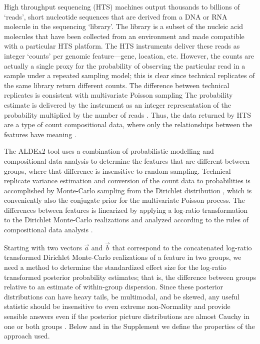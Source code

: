 High throughput sequencing (HTS) machines output thousands to billions of `reads', short nucleotide sequences that are derived from a DNA or RNA molecule in the sequencing `library'. The library is a subset of the nucleic acid molecules that have been collected from an environment and made compatible with a particular HTS platform. The HTS instruments deliver these reads as integer `counts' per genomic feature---gene, location, etc. However, the counts are actually a single proxy for the probability of observing the particular read in a sample under a repeated sampling model; this is clear since technical replicates of the same library return different counts. The difference between technical replicates is consistent with multivariate Poisson sampling \citep{fernandes:2013, gloorAJS:2016} The probability estimate is delivered by the instrument as an integer representation of the probability multiplied by the number of reads  \citep{fernandes:2013, gloorAJS:2016}. Thus, the data returned by HTS are a type of count compositional data, where only the relationships between the features have meaning \citep{aitchison:1986, Lovell:2015,fernandes:2014,gloorFrontiers:2017,Kaul:2017aa}. 

The ALDEx2 tool uses a combination of probabilistic modelling and compositional data analysis to determine the features that are different between groups, where that difference is insensitive to random sampling. Technical replicate variance estimation and conversion of the count data to probabilities is accomplished by Monte-Carlo sampling from the Dirichlet distribution \citep{fernandes:2013, gloorAJS:2016}, which is conveniently also the conjugate prior for the multivariate Poisson process. The differences between features is linearized by applying a log-ratio transformation to the Dirichlet Monte-Carlo realizations and analyzed according to the rules of compositional data analysis \citep{aitchison:1986,fernandes:2013,Tsilimigras:2016aa,gloorFrontiers:2017}.
	
Starting with two vectors $\vec{a}$ and $\vec{b}$  that correspond to the concatenated log-ratio transformed Dirichlet Monte-Carlo realizations of a feature in two groups, we need a method to determine the standardized effect size  for the log-ratio transformed posterior probability estimates;  that is, the difference between groups relative to an estimate of within-group dispersion. Since these posterior distributions can have heavy tails, be multimodal, and be skewed, any useful statistic should be insensitive to even extreme non-Normality and provide sensible answers even if the posterior picture distributions are almost Cauchy in one or both groups \citep{fernandes:2013}. Below and in the Supplement we define the properties of the approach used. 

